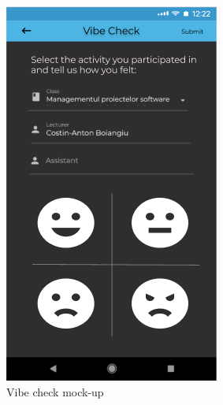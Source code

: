 \begin{figure}[!ht]
\begin{minipage}[b]{0.321\textwidth}
            \includegraphics[width=\textwidth]{figures/app/initial/vibe_check.png}
            \caption{Vibe check mock-up}
            \label{4:fig:figma_vibe_check}
        \end{minipage}
    \end{figure}
    
